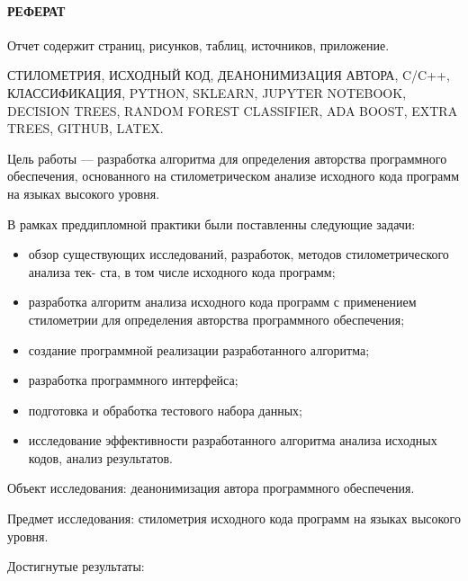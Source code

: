 \newpage
{}
\paragraph{\hfill РЕФЕРАТ \hfill}
Отчет содержит  страниц,  рисунков,  таблиц,  источников,  приложение.

СТИЛОМЕТРИЯ, ИСХОДНЫЙ КОД, ДЕАНОНИМИЗАЦИЯ АВТОРА, C/C++, КЛАССИФИКАЦИЯ, PYTHON, SKLEARN, JUPYTER NOTEBOOK, DECISION
TREES, RANDOM FOREST CLASSIFIER, ADA BOOST, EXTRA TREES, GITHUB, LATEX.

Цель работы --- разработка алгоритма для определения авторства программного обеспечения, основанного на стилометрическом анализе исходного кода программ на языках высокого уровня.

В рамках преддипломной практики были поставленны следующие задачи: 
\begin{itemize}
  \item обзор существующих исследований, разработок, методов стилометрического анализа тек-
ста, в том числе исходного кода программ;
  \item разработка алгоритм анализа исходного кода программ с применением стилометрии для
определения авторства программного обеспечения;
  \item создание программной реализации разработанного алгоритма;
  \item разработка программного интерфейса;
  \item подготовка и обработка тестового набора данных;
  \item исследование эффективности разработанного алгоритма анализа исходных кодов, анализ результатов.
\end{itemize}

Объект исследования: деанонимизация автора программного обеспечения. 

Предмет исследования: стилометрия исходного кода программ на языках высокого уровня.

Достигнутые результаты:

